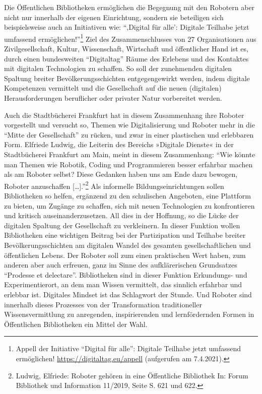 \documentclass[a4paper,
fontsize=11pt,
oneside,
numbers=noperiodatend,
parskip=half-,
bibliography=totoc,
final
]{scrartcl}
\begin{document}
Die Öffentlichen Bibliotheken ermöglichen die Begegnung mit den Robotern
aber nicht nur innerhalb der eigenen Einrichtung, sondern sie beteiligen
sich beispielsweise auch an Initiativen wie: \enquote{‚Digital für
alle': Digitale Teilhabe jetzt umfassend ermöglichen!}\footnote{Appell
  der Initiative \enquote{Digital für alle}: Digitale Teilhabe jetzt
  umfassend ermöglichen! \url{https://digitaltag.eu/appell} (aufgerufen
  am 7.4.2021).} Ziel des Zusammenschlusses von 27 Organisationen aus
Zivilgesellschaft, Kultur, Wissenschaft, Wirtschaft und öffentlicher
Hand ist es, durch einen bundesweiten \enquote{Digitaltag} Räume des
Erlebens und des Kontaktes mit digitalen Technologien zu schaffen. So
soll der zunehmenden digitalen Spaltung breiter Bevölkerungsschichten
entgegengewirkt werden, indem digitale Kompetenzen vermittelt und die
Gesellschaft auf die neuen (digitalen) Herausforderungen beruflicher
oder privater Natur vorbereitet werden.

Auch die Stadtbücherei Frankfurt hat in diesem Zusammenhang ihre Roboter
vorgestellt und versucht so, Themen wie Digitalisierung und Roboter mehr
in die \enquote{Mitte der Gesellschaft} zu rücken, und zwar in einer
plastischen und erlebbaren Form. Elfriede Ludwig, die Leiterin des
Bereichs »Digitale Dienste« in der Stadtbücherei Frankfurt am Main,
meint in diesem Zusammenhang: \enquote{Wie könnte man Themen wie
Robotik, Coding und Programmieren besser erfahrbar machen als am Roboter
selbst? Diese Gedanken haben uns am Ende dazu bewogen, Roboter
anzuschaffen {[}\ldots{]}.}\footnote{Ludwig, Elfriede: Roboter gehören
  in eine Öffentliche Bibliothek In: Forum Bibliothek und Information
  11/2019, Seite S. 621 und 622.} Als informelle Bildungseinrichtungen
sollen Bibliotheken so helfen, ergänzend zu den schulischen Angeboten,
eine Plattform zu bieten, um Zugänge zu schaffen, sich mit neuen
Technologien zu konfrontieren und kritisch auseinanderzusetzen. All dies
in der Hoffnung, so die Lücke der digitalen Spaltung der Gesellschaft zu
verkleinern. In dieser Funktion wollen Bibliotheken eine wichtigen
Beitrag bei der Partizipation und Teilhabe breiter Bevölkerungsschichten
am digitalen Wandel des gesamten gesellschaftlichen und öffentlichen
Lebens. Der Roboter soll zum einen praktischen Wert haben, zum anderen
aber auch erfreuen, ganz im Sinne des aufklärerischen Grundsatzes
\enquote{Prodesse et delectare}. Bibliotheken sind in dieser Funktion
Erkundungs- und Experimentierort, an dem man Wissen vermittelt, das
sinnlich erfahrbar und erlebbar ist. Digitales Mindset ist das
Schlagwort der Stunde. Und Roboter sind innerhalb dieses Prozesses von
der Transformation traditioneller Wissensvermittlung zu anregenden,
inspirierenden und lernfördernden Formen in Öffentlichen Bibliotheken
ein Mittel der Wahl.
\end{document}
